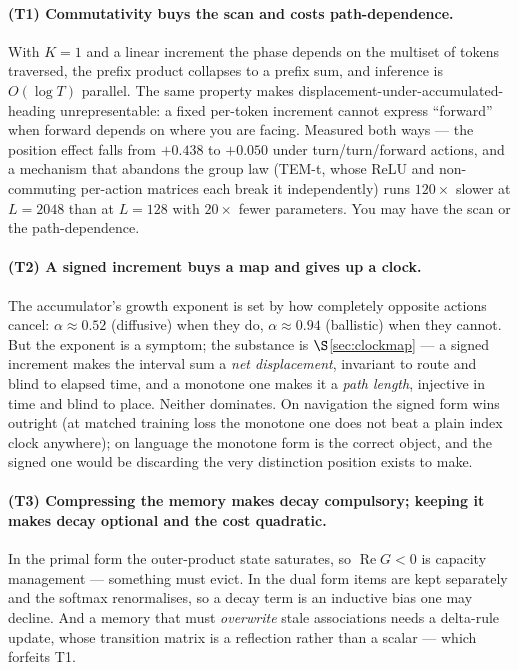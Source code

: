 \documentclass[11pt]{article}
\begin{document}
\paragraph{(T1) Commutativity buys the scan and costs path-dependence.} With $K=1$
and a linear increment the phase depends on the multiset of tokens traversed, the
prefix product collapses to a prefix sum, and inference is $O(\log T)$ parallel. The
same property makes displacement-under-accumulated-heading unrepresentable: a fixed
per-token increment cannot express ``forward'' when forward depends on where you are
facing. Measured both ways --- the position effect falls from $+0.438$ to $+0.050$
under turn/turn/forward actions, and a mechanism that abandons the group law
(TEM-t, whose ReLU and non-commuting per-action matrices each break it
independently) runs $120\times$ slower at $L=2048$ than at $L=128$ with $20\times$
fewer parameters. You may have the scan or the path-dependence.

\paragraph{(T2) A signed increment buys a map and gives up a clock.} The accumulator's
growth exponent is set by how completely opposite actions cancel:
$\alpha\approx0.52$ (diffusive) when they do, $\alpha\approx0.94$ (ballistic) when
they cannot. But the exponent is a symptom; the substance is $\S$\ref{sec:clockmap} ---
a signed increment makes the interval sum a \emph{net displacement}, invariant to
route and blind to elapsed time, and a monotone one makes it a \emph{path length},
injective in time and blind to place. Neither dominates. On navigation the signed
form wins outright (at matched training loss the monotone one does not beat a plain
index clock anywhere); on language the monotone form is the correct object, and the
signed one would be discarding the very distinction position exists to make.

\paragraph{(T3) Compressing the memory makes decay compulsory; keeping it makes decay
optional and the cost quadratic.} In the primal form the outer-product state
saturates, so $\operatorname{Re}G<0$ is capacity management --- something must evict.
In the dual form items are kept separately and the softmax renormalises, so a decay
term is an inductive bias one may decline. And a memory that must \emph{overwrite}
stale associations needs a delta-rule update, whose transition matrix is a reflection
rather than a scalar --- which forfeits T1.
\end{document}
